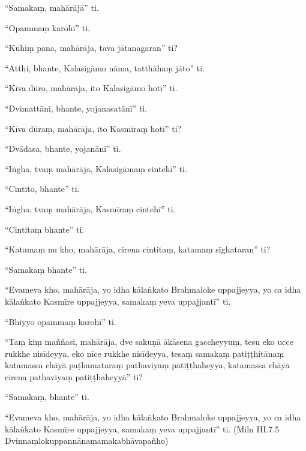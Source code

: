 “Samakaṃ, mahārājā” ti.

“Opammaṃ karohī” ti.

“Kuhiṃ pana, mahārāja, tava jātanagaran” ti?

“Atthi, bhante, Kalasigāmo nāma, tatthāhaṃ jāto” ti.

“Kīva dūro, mahārāja, ito Kalasigāmo hotī” ti.

“Dvimattāni, bhante, yojanasatānī” ti.

“Kīva dūraṃ, mahārāja, ito Kasmīraṃ hotī” ti?

“Dvādasa, bhante, yojanānī” ti.

“Iṅgha, tvaṃ mahārāja, Kalasigāmaṃ cintehī” ti.

“Cintito, bhante” ti.

“Iṅgha, tvaṃ mahārāja, Kasmīraṃ cintehī” ti.

“Cintitaṃ bhante” ti.

“Katamaṃ nu kho, mahārāja, cirena cintitaṃ, katamaṃ sīghataran” ti?

“Samakaṃ bhante” ti.

“Evameva kho, mahārāja, yo idha kālaṅkato Brahmaloke uppajjeyya, yo ca idha kālaṅkato Kasmīre uppajjeyya, samakaṃ yeva uppajjantī” ti.

“Bhiyyo opammaṃ karohī” ti.

“Taṃ kiṃ maññasi, mahārāja, dve sakuṇā ākāsena gaccheyyuṃ, tesu eko ucce rukkhe nisīdeyya, eko nīce rukkhe nisīdeyya, tesaṃ samakaṃ patiṭṭhitānaṃ katamassa chāyā paṭhamataraṃ pathaviyaṃ patiṭṭhaheyya, katamassa chāyā cirena pathaviyaṃ patiṭṭhaheyyā” ti?

“Samakaṃ, bhante” ti.

“Evameva kho, mahārāja, yo idha kālaṅkato Brahmaloke uppajjeyya, yo ca idha kālaṅkato Kasmīre uppajjeyya, samakaṃ yeva uppajjantī” ti. \hfill(Miln III.7.5 Dvinnaṃlokuppannānaṃamakabhāvapañho)